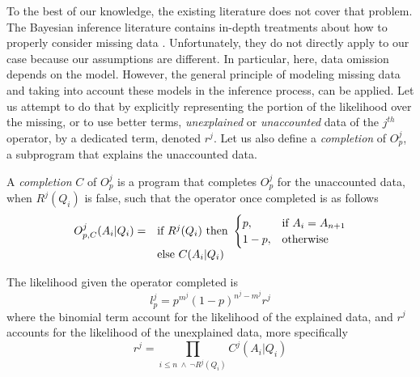 \documentclass[runningheads]{llncs}
\begin{document}
To the best of our knowledge, the existing literature does not cover
that problem. The Bayesian inference literature contains in-depth
treatments about how to properly consider missing data
\cite{Schafer02missingdata}. Unfortunately, they do not directly apply
to our case because our assumptions are different. In particular,
here, data omission depends on the model. However, the general
principle of modeling missing data and taking into account these
models in the inference process, can be applied. Let us attempt to do
that by explicitly representing the portion of the likelihood over the
missing, or to use better terms, \emph{unexplained} or
\emph{unaccounted} data of the $j^{th}$ operator, by a dedicated term,
denoted $r^j$.
Let us also define a \emph{completion} of $O^j_p$, a subprogram that
explains the unaccounted data.
\begin{definition}
  A \emph{completion} $C$ of $O^j_p$ is a program that completes
  $O^j_p$ for the unaccounted data, when $R^j(Q_i)$ is false, such
  that the operator once completed is as follows
  \begin{equation}
  \begin{array}{@{}ll@{}}
    O^j_{p, C}(A_i|Q_i) = &
                            \text{if}\ R^j(Q_i)\ \text{then}\
                            \begin{cases}
                              p, & \text{if}\ A_i = A_{n+1} \\
                              1-p, & \text{otherwise}
                            \end{cases}\\
                          & \text{else}\ C(A_i|Q_i)
  \end{array}
  \end{equation}
\end{definition}
The likelihood given the operator completed is
\begin{equation}
  \label{new-lik}
l^j_p = p^{m^j}(1-p)^{n^j-m^j} r^j
\end{equation}
where the binomial term account for the likelihood of the explained
data, and $r^j$ accounts for the likelihood of the unexplained data,
more specifically
\begin{equation}
  r^j = \prod_{i \leq n\ \land\ \neg R^j(Q_i)} C^j(A_i|Q_i)
\end{equation}
\end{document}
